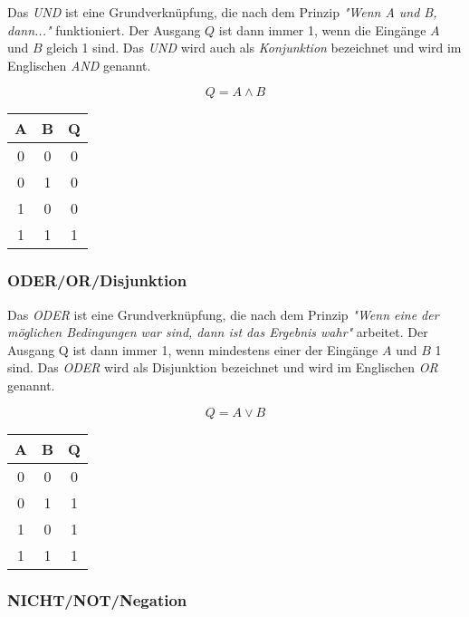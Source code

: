 \documentclass[a4paper, 12pt]{report}
\begin{document}
Das \emph{UND} ist eine Grundverknüpfung, die nach dem Prinzip 
\emph{"Wenn A und B, dann..."} funktioniert. Der Ausgang $Q$ ist dann immer 1, 
wenn die Eingänge $A$ und $B$ gleich 1 sind. Das \emph{UND} wird auch als 
\emph{Konjunktion} bezeichnet und wird im Englischen \emph{AND} genannt. 

\begin{center}
    \begin{equation}
        Q = A \land B
    \end{equation}
    \begin{tabular}{ | c | c || c | }
    	\hline
    	A & B & Q \\ \hline 
    	0 & 0 & 0 \\ \hline
    	0 & 1 & 0 \\ \hline
    	1 & 0 & 0 \\ \hline
    	1 & 1 & 1 \\ 
    	\hline
    \end{tabular}
\end{center}

\subsubsection{ODER/OR/Disjunktion}

Das \emph{ODER} ist eine Grundverknüpfung, die nach dem Prinzip 
\emph{"Wenn eine der möglichen Bedingungen war sind, dann ist das Ergebnis 
wahr"} arbeitet. Der Ausgang Q ist dann immer 1, wenn mindestens einer der 
Eingänge $A$ und $B$ 1 sind. Das \emph{ODER} wird als Disjunktion bezeichnet 
und wird im Englischen \emph{OR} genannt. 

\begin{center}
    \begin{equation}
        Q = A \lor B
    \end{equation}
   \begin{tabular}{ | c | c || c | }
    	\hline
    	A & B & Q \\ \hline
    	0 & 0 & 0 \\ \hline
    	0 & 1 & 1 \\ \hline
    	1 & 0 & 1 \\ \hline
    	1 & 1 & 1 \\ 
    	\hline
    \end{tabular}
\end{center}

\subsubsection{NICHT/NOT/Negation}
\end{document}
